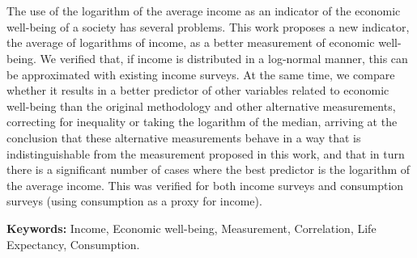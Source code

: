 \chapter*{\runtitle}

The use of the logarithm of the average income as an indicator of the economic well-being of a society has several problems. This work proposes a new indicator, the average of logarithms of income, as a better measurement of economic well-being. We verified that, if income is distributed in a log-normal manner, this can be approximated with existing income surveys. At the same time, we compare whether it results in a better predictor of other variables related to economic well-being than the original methodology and other alternative measurements, correcting for inequality or taking the logarithm of the median, arriving at the conclusion that these alternative measurements behave in a way that is indistinguishable from the measurement proposed in this work, and that in turn there is a significant number of cases where the best predictor is the logarithm of the average income. This was verified for both income surveys and consumption surveys (using consumption as a proxy for income).
\bigskip

\noindent\textbf{Keywords:} Income, Economic well-being, Measurement, Correlation, Life Expectancy, Consumption.